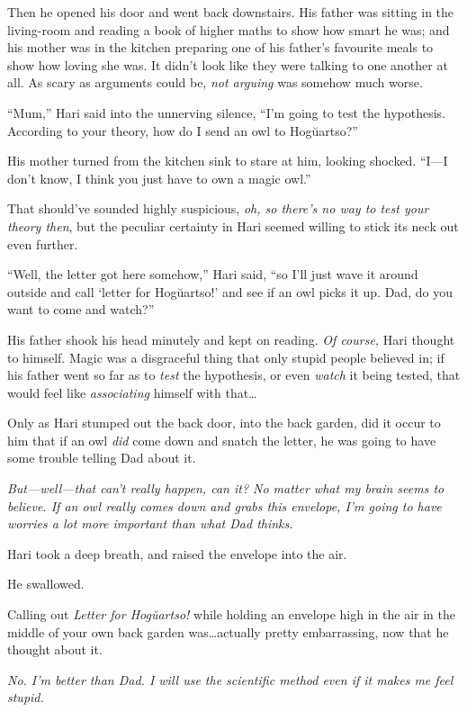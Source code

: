 Then he opened his door and went back downstairs. His father was sitting in the living-room and reading a book of higher maths to show how smart he was; and his mother was in the kitchen preparing one of his father’s favourite meals to show how loving she was. It didn’t look like they were talking to one another at all. As scary as arguments could be, \emph{not arguing} was somehow much worse.

“Mum,” Hari said into the unnerving silence, “I’m going to test the hypothesis. According to your theory, how do I send an owl to Hogŭartso?”

His mother turned from the kitchen sink to stare at him, looking shocked. “I—I don’t know, I think you just have to own a magic owl.”

That should’ve sounded highly suspicious, \emph{oh, so there’s no way to test your theory then}, but the peculiar certainty in Hari seemed willing to stick its neck out even further.

“Well, the letter got here somehow,” Hari said, “so I’ll just wave it around outside and call ‘letter for Hogŭartso!’ and see if an owl picks it up. Dad, do you want to come and watch?”

His father shook his head minutely and kept on reading. \emph{Of course,} Hari thought to himself. Magic was a disgraceful thing that only stupid people believed in; if his father went so far as to \emph{test} the hypothesis, or even \emph{watch} it being tested, that would feel like \emph{associating} himself with that…

Only as Hari stumped out the back door, into the back garden, did it occur to him that if an owl \emph{did} come down and snatch the letter, he was going to have some trouble telling Dad about it.

\emph{But—well—that can’t \emph{really} happen, can it? No matter what my brain seems to believe. If an owl really comes down and grabs this envelope, I’m going to have worries a lot more important than what Dad thinks.}

Hari took a deep breath, and raised the envelope into the air.

He swallowed.

Calling out \emph{Letter for Hogŭartso!} while holding an envelope high in the air in the middle of your own back garden was…actually pretty embarrassing, now that he thought about it.

\emph{No. I’m better than Dad. I will use the scientific method even if it makes me feel stupid.}

